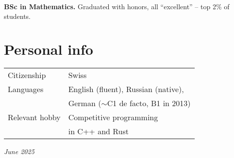 \documentclass[a4paper, twocolumn, 10pt]{article}
\begin{document}
\textbf{BSc in Mathematics.} Graduated with honors, all ``excellent'' -- top 2\% of students.

\section*{Personal info}

\begin{tabular}{l l}
  \vspace{0.2cm}
  Citizenship & Swiss \\
  Languages & English (fluent), Russian (native), \\
  \vspace{0.2cm}
  & German ($\sim$C1 de facto, B1 in 2013) \\
  Relevant hobby & Competitive programming \\
  \vspace{0.2cm}
  & in C++ and Rust \\
\end{tabular}

\vspace*{\fill}
\hfill \emph{June 2025}
\end{document}
